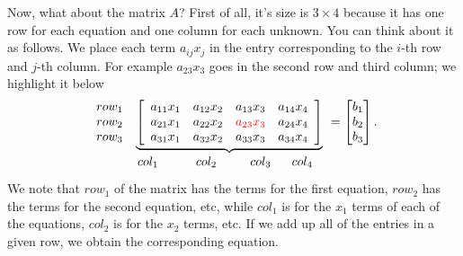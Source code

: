 \begin{tcolorbox}[sharp corners, colback=green!30, colframe=green!80!blue, title={\bf \Large From Multiple Linear Equations to Matrices and Vectors}]
Now, what about the matrix $A$? First of all, it's size is $3 \times 4$ because it has one row for each equation and one column for each unknown. You can think about it as follows. We place each term $a_{ij} x_j$ in the entry corresponding to the $i$-th row and $j$-th column. For example $a_{23}x_3$ goes in the second row and third column; we highlight it below
\begin{equation}
\label{eq:3Eqns4unknowns_part02}
 \begin{array}{c}  row_1 \\ row_2\\row_3 \end{array}  \underbrace{ \left[ \begin{array}{cccc}
a_{11} x_1& a_{12}x_2 &  a_{13}x_3 & a_{14}x_4 \\
a_{21} x_1& a_{22}x_2 &  \color{red} a_{23}x_3 & a_{24}x_4 \\
a_{31} x_1& a_{32}x_2 & a_{33}x_3 & a_{34}x_4
\end{array} \right] }_{\begin{array}{cccc} col_1~~ & ~~~~col_2~~& ~~~col_3 & ~~col_4 ~~\end{array}}  = \begin{bmatrix} b_1 \\ b_2 \\b_3 \end{bmatrix}.
\end{equation}
We note that $row_1$ of the matrix has the terms for the first equation, $row_2$ has the terms for the second equation, etc, while $col_1$ is for the $x_1$ terms of each of the equations,  $col_2$ is for the $x_2$ terms, etc. If we add up all of the entries in a given row, we obtain the corresponding equation.\\


\end{tcolorbox}
